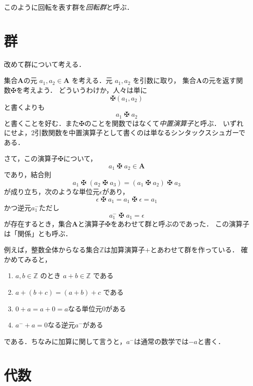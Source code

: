 \documentclass{jsbook}
\newcommand{\keyword}[1]{\emph{#1}}
\newcommand{\bg}[1]{\mathbf{#1}}
\newcommand{\opmaltese}{\mathop{\maltese}}
\begin{document}
このように回転を表す群を\keyword{回転群}と呼ぶ．

\section{群}

改めて群について考える．

集合$\bg{A}$の元 $a_1,a_2\in\bg{A}$ を考える．元 $a_1,a_2$ を引数に取り，
集合$\bg{A}$の元を返す関数$\maltese$を考えよう．
どういうわけか，人々は単に
\begin{equation}
\maltese(a_1,a_2)
\end{equation}
と書くよりも
\begin{equation}
a_1\opmaltese a_2
\end{equation}
と書くことを好む．また$\maltese$のことを関数ではなくて\keyword{中置演算子}と呼ぶ．
いずれにせよ，2引数関数を中置演算子として書くのは単なるシンタックスシュガーである．

さて，この演算子$\maltese$について，
\begin{equation}
a_1\opmaltese a_2\in\bg{A}
\end{equation}
であり，結合則
\begin{equation}
a_1\opmaltese(a_2\opmaltese a_3)=(a_1\opmaltese a_2)\opmaltese a_3
\end{equation}
が成り立ち，次のような単位元$\epsilon$があり，
\begin{equation}
\epsilon\opmaltese a_1=a_1\opmaltese\epsilon=a_1
\end{equation}
かつ逆元$a_1^{-}$ただし
\begin{equation}
a_1^{-}\opmaltese a_1=\epsilon
\end{equation}
が存在するとき，集合$\bg{A}$と演算子$\maltese$をあわせて群と呼ぶのであった．
この演算子は「関係」とも呼ぶ．

例えば，整数全体からなる集合$\mathbb{Z}$は加算演算子$+$とあわせて群を作っている．
確かめてみると，
\begin{enumerate}
\item $a,b\in\mathbb{Z}$ のとき $a+b\in\mathbb{Z}$ である
\item $a+(b+c)=(a+b)+c$ である
\item $0+a=a+0=a$なる単位元$0$がある
\item $a^{-}+a=0$なる逆元$a^{-}$がある
\end{enumerate}
である．ちなみに加算に関して言うと，$a^{-}$は通常の数学では$-a$と書く．

\section{代数}
\end{document}
